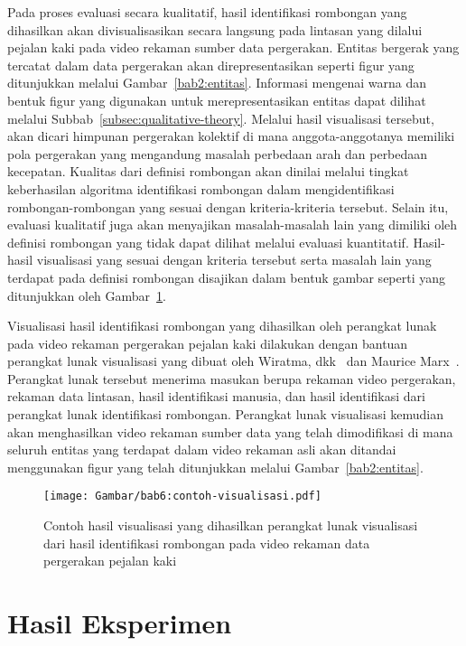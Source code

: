 Pada proses evaluasi secara kualitatif, hasil identifikasi rombongan yang dihasilkan akan divisualisasikan secara langsung pada lintasan yang dilalui pejalan kaki pada video rekaman sumber data pergerakan. Entitas bergerak yang tercatat dalam data pergerakan akan direpresentasikan seperti figur yang ditunjukkan melalui Gambar~\ref{bab2:entitas}. Informasi mengenai warna dan bentuk figur yang digunakan untuk merepresentasikan entitas dapat dilihat melalui Subbab~\ref{subsec:qualitative-theory}. Melalui hasil visualisasi tersebut, akan dicari himpunan pergerakan kolektif di mana anggota-anggotanya memiliki pola pergerakan yang mengandung masalah perbedaan arah dan perbedaan kecepatan. Kualitas dari definisi rombongan akan dinilai melalui tingkat keberhasilan algoritma identifikasi rombongan dalam mengidentifikasi rombongan-rombongan yang sesuai dengan kriteria-kriteria tersebut. Selain itu, evaluasi kualitatif juga akan menyajikan masalah-masalah lain yang dimiliki oleh definisi rombongan yang tidak dapat dilihat melalui evaluasi kuantitatif. Hasil-hasil visualisasi yang sesuai dengan kriteria tersebut serta masalah lain yang terdapat pada definisi rombongan disajikan dalam bentuk gambar seperti yang ditunjukkan oleh Gambar~\ref{bab6:contoh-visualisasi}.

Visualisasi hasil identifikasi rombongan yang dihasilkan oleh perangkat lunak pada video rekaman pergerakan pejalan kaki dilakukan dengan bantuan perangkat lunak visualisasi yang dibuat oleh Wiratma, dkk~\cite{wiratma:software} dan Maurice Marx~\cite{marx:software}. Perangkat lunak tersebut menerima masukan berupa rekaman video pergerakan, rekaman data lintasan, hasil identifikasi manusia, dan hasil identifikasi dari perangkat lunak identifikasi rombongan. Perangkat lunak visualisasi kemudian akan menghasilkan video rekaman sumber data yang telah dimodifikasi di mana seluruh entitas yang terdapat dalam video rekaman asli akan ditandai menggunakan figur yang telah ditunjukkan melalui Gambar~\ref{bab2:entitas}.

\begin{figure}[h!]
    \centering
    \captionsetup{width=0.85\textwidth}
    \texttt{[image: Gambar/bab6:contoh-visualisasi.pdf]}
    \caption[Contoh hasil visualisasi rombongan]{Contoh hasil visualisasi yang dihasilkan perangkat lunak visualisasi dari hasil identifikasi rombongan pada video rekaman data pergerakan pejalan kaki}
    \label{bab6:contoh-visualisasi}
\end{figure}

\section{Hasil Eksperimen}
\label{sec:result}

